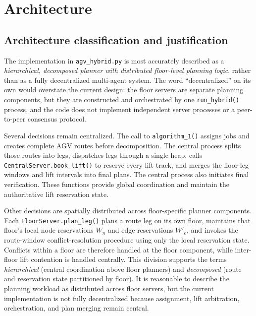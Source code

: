 \documentclass[11pt]{article}
\begin{document}
\section{Architecture}
\label{sec:architecture-classification}

\subsection{Architecture classification and justification}

The implementation in \texttt{agv\_hybrid.py} is most accurately described
as a \emph{hierarchical, decomposed planner with distributed floor-level
planning logic}, rather than as a fully decentralized multi-agent system.
The word ``decentralized'' on its own would overstate the current design:
the floor servers are separate planning components, but they are constructed
and orchestrated by one \texttt{run\_hybrid()} process, and the code does not
implement independent server processes or a peer-to-peer consensus protocol.

Several decisions remain centralized. The call to \texttt{algorithm\_1()}
assigns jobs and creates complete AGV routes before decomposition. The
central process splits those routes into legs, dispatches legs through a
single heap, calls \texttt{CentralServer.book\_lift()} to reserve every lift
track, and merges the floor-leg windows and lift intervals into final plans.
The central process also initiates final verification. These functions
provide global coordination and maintain the authoritative lift reservation
state.

Other decisions are spatially distributed across floor-specific planner
components. Each \texttt{FloorServer.plan\_leg()} plans a route leg on its own
floor, maintains that floor's local node reservations $W_n$ and edge
reservations $W'_e$, and invokes the route-window conflict-resolution
procedure using only the local reservation state. Conflicts within a floor
are therefore handled at the floor component, while inter-floor lift
contention is handled centrally. This division supports the terms
\emph{hierarchical} (central coordination above floor planners) and
\emph{decomposed} (route and reservation state partitioned by floor). It is
reasonable to describe the planning workload as distributed across floor
servers, but the current implementation is not fully decentralized because
assignment, lift arbitration, orchestration, and plan merging remain central.
\end{document}
